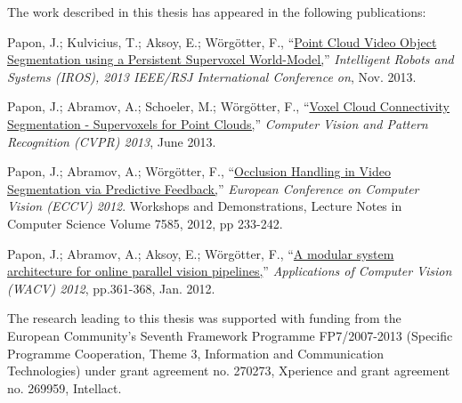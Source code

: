 
\noindent


The work described in this thesis has appeared in the following publications: \\
\vspace{24pt} 

\hangindent=1.5cm Papon, J.;  Kulvicius, T.; Aksoy, E.; Wörgötter, F., ``\href{http://www.dpi.physik.uni-goettingen.de/cns/uploads_bibtexmodule/PDF/paponkulviciusaksoy2013.pdf}{Point Cloud Video Object Segmentation using a Persistent Supervoxel World-Model,}'' \emph{Intelligent Robots and Systems (IROS), 2013 IEEE/RSJ International Conference on}, Nov. 2013. \\
\vspace{12pt}

\hangindent=1.5cm Papon, J.;  Abramov, A.; Schoeler, M.; Wörgötter, F., ``\href{http://www.cv-foundation.org/openaccess/content_cvpr_2013/papers/Papon_Voxel_Cloud_Connectivity_2013_CVPR_paper.pdf}{Voxel Cloud Connectivity Segmentation - Supervoxels for Point Clouds,}'' \emph{Computer Vision and Pattern Recognition (CVPR) 2013}, June 2013. \\
\vspace{12pt}

\hangindent=1.5cm Papon, J.;  Abramov, A.; Wörgötter, F., ``\href{http://dx.doi.org/10.1007/978-3-642-33885-4_24}{Occlusion Handling in Video Segmentation via Predictive Feedback,}'' \emph{European Conference on Computer Vision (ECCV) 2012}. Workshops and Demonstrations, Lecture Notes in Computer Science Volume 7585, 2012, pp 233-242. \\
\vspace{12pt}

\hangindent=1.5cm Papon, J.;  Abramov, A.; Aksoy, E.; Wörgötter, F., ``\href{http://dx.doi.org/10.1109/WACV.2012.6163002}{A modular system architecture for online parallel vision pipelines,}'' \emph{Applications of Computer Vision (WACV) 2012}, pp.361-368, Jan. 2012. \\
\vspace{100pt}

The research leading to this thesis was supported with funding from the European Community's Seventh Framework Programme FP7/2007-2013 (Specific Programme Cooperation, Theme 3, Information and Communication Technologies) under grant agreement no. 270273, Xperience and grant agreement no. 269959, Intellact.

 
